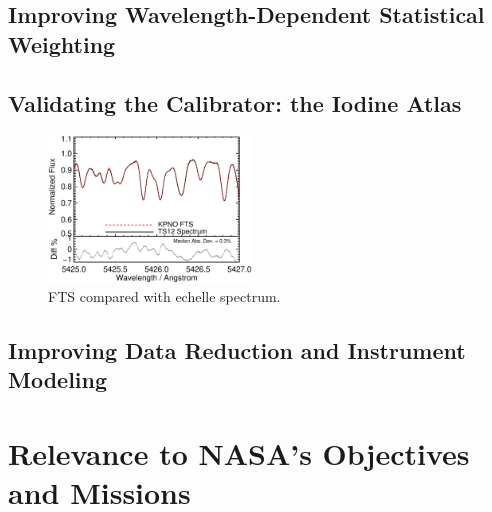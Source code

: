\documentclass[12pt]{article}
\begin{document}
\subsection{Improving Wavelength-Dependent Statistical Weighting}\label{sec:vanking}


\vspace{-3pt}
\subsection{Validating the Calibrator: the Iodine Atlas}\label{sec:fts}


\begin{figure}
  \vspace{-35pt}
  \begin{center}
    \includegraphics[width=0.48\textwidth]{fts}
  \end{center}
  \vspace{-25pt}  
  \caption{FTS compared with echelle spectrum.}
  \vspace{-8pt}  
  \label{fts}
\end{figure}

\vspace{-3pt}
\subsection{Improving Data Reduction and Instrument Modeling}\label{sec:ip}








 
\vspace{-3pt}
\section{Relevance to NASA's Objectives and Missions}
\end{document}
